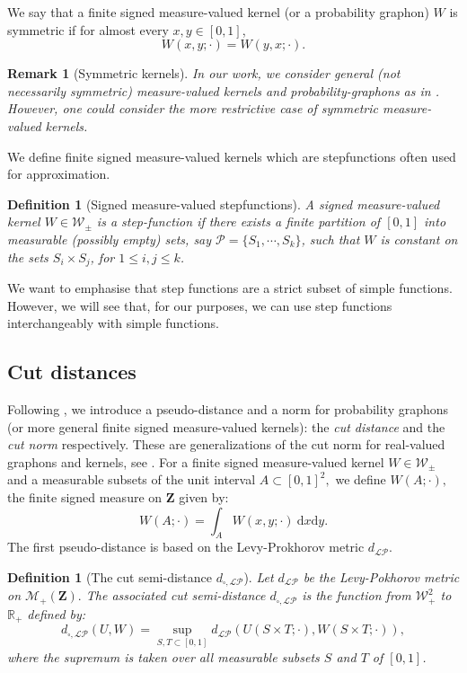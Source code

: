 \documentclass[11pt]{article}
\newtheorem{definition}[theorem]{Definition}
\newtheorem{remark}[theorem]{Remark}
\def\R{\mathbb{R}}
\newcommand{\Space}{\mathbf{Z}}
\newcommand{\signed}{\pm}
\newcommand{\Meas}{\mathcal{M}_+(\Space)}
\newcommand{\Kernel}{\mathcal{W}_{\signed}}
\newcommand{\Kernelp}{\mathcal{W}_{+}}
\begin{document}
We say that a finite signed measure-valued kernel (or a probability graphon) $W$ is symmetric if for almost every $x,y \in [0,1]$, $$W(x,y;\cdot)=W(y,x;\cdot).$$

\begin{remark}[Symmetric kernels]
In our work, we consider general (not necessarily symmetric) measure-valued kernels and probability-graphons as in \cite{abraham2023probabilitygraphons}. However, one could consider the more restrictive case of symmetric measure-valued kernels.  
\end{remark}

We define finite signed measure-valued kernels which are stepfunctions often used for approximation.
 
\begin{definition}[Signed measure-valued stepfunctions]
  \label{def:stepfunction}
  A signed measure-valued kernel $W\in \Kernel$ is a \emph{step-function} if there exists a
  finite partition of $[0,1]$ into measurable (possibly empty) sets, say
  $\mathcal{P}=\{S_1,\cdots,S_k\}$, such that $W$ is constant on the sets
  $S_i \times  S_j$, for $1\leq i,j\leq  k$.  \end{definition}
We want to emphasise that step functions are a strict subset of simple functions. However, we will see that, for our purposes, we can use step functions interchangeably with simple functions.

\subsection{Cut distances}\label{section_def_dcut}

Following \cite{abraham2023probabilitygraphons}, we introduce a pseudo-distance and a norm for probability graphons (or more general finite signed measure-valued kernels): the \emph{cut distance} and the \emph{cut norm} respectively. These are generalizations of the cut norm for real-valued graphons and kernels, see \cite[Chapter 8]{LovaszGraphLimits}. For a finite signed measure-valued kernel $W\in\Kernel$ and a measurable subsets of the unit interval $A\subset [0,1]^2,$ we define $W(A;\cdot),$ the finite signed measure on $\Space$ given by:
$$
  W(A;\cdot) = \int_{A} W(x,y;\cdot)\ \mathrm{d} x \mathrm{d} y.
$$
 The first pseudo-distance is based on the Levy-Prokhorov metric $d_{\mathcal{LP}}.$

\begin{definition}[The cut semi-distance $d_{\square, \mathcal{LP}}$]
Let $d_{\mathcal{LP}}$ be the Levy-Pokhorov metric on $\Meas.$  %
The associated cut semi-distance $d_{\square, \mathcal{LP}}$ is the function from $\Kernelp^2$ to $\R_{+}$ defined by:
\begin{equation}\label{cutsemi-disteq}
    d_{\square, \mathcal{LP}}(U, W)=\sup _{S, T \subset[0,1]} d_{\mathcal{LP}}(U(S \times T ; \cdot), W(S \times T ; \cdot)),
\end{equation}
where the supremum is taken over all measurable subsets $S$ and $T$ of $[0,1]$.
\end{definition}
\end{document}

